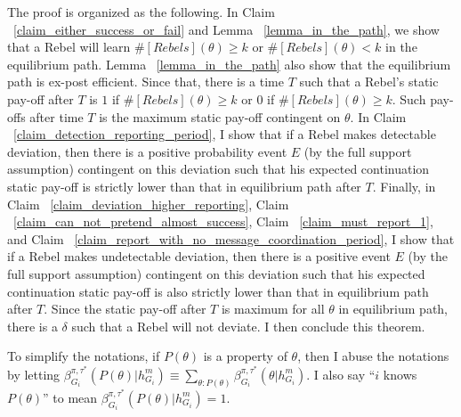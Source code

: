 \documentclass[12pt,letter]{article}
\theoremstyle{definition}
\theoremstyle{remark}
\theoremstyle{claim}
\begin{document}
The proof is organized as the following. In Claim ~\ref{claim_either_success_or_fail} and Lemma ~\ref{lemma_in_the_path}, we show that a Rebel will learn $\#[Rebels](\theta)\geq k$ or $\#[Rebels](\theta)< k$ in the equilibrium path. Lemma ~\ref{lemma_in_the_path} also show that the equilibrium path is ex-post efficient. Since that, there is a time $T$ such that a Rebel's static pay-off after $T$ is $1$ if $\#[Rebels](\theta)\geq k$ or $0$ if $\#[Rebels](\theta)\geq k$. Such pay-offs after time $T$ is the maximum static pay-off contingent on $\theta$. In Claim ~\ref{claim_detection_reporting_period}, I show that if a Rebel makes detectable deviation, then there is a positive probability event $E$ (by the full support assumption) contingent on this deviation such that his expected continuation static pay-off is strictly lower than that in equilibrium path after $T$. Finally, in Claim ~\ref{claim_deviation_higher_reporting}, Claim ~\ref{claim_can_not_pretend_almost_success}, Claim ~\ref{claim_must_report_1}, and Claim ~\ref{claim_report_with_no_message_coordination_period}, I show that if a Rebel makes undetectable deviation, then there is a positive event $E$ (by the full support assumption) contingent on this deviation such that his expected continuation static pay-off is also strictly lower than that in equilibrium path after $T$. Since the static pay-off after $T$ is maximum for all $\theta$ in equilibrium path, there is a $\delta$ such that a Rebel will not deviate. I then conclude this theorem.

To simplify the notations, if $P(\theta)$ is a property of $\theta$, then I abuse the notations by letting $\beta^{\pi,\tau^*}_{G_i}(P(\theta)|h^{m}_{G_i})\equiv \sum_{\theta:P(\theta)}\beta^{\pi,\tau^*}_{G_i}(\theta|h^{m}_{G_i})$. I also say ``$i$ knows $P(\theta)$'' to mean $\beta^{\pi,\tau^*}_{G_i}(P(\theta)|h^{m}_{G_i})=1$. 
\end{document}
